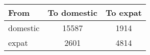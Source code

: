 \begin{tabular}{lcc}
\hline \hline
 From &  To domestic & To expat \\
\hline

domestic & 15587 & 1914 \\ 
expat & 2601 & 4814 \\ 
\hline \hline
\end{tabular}